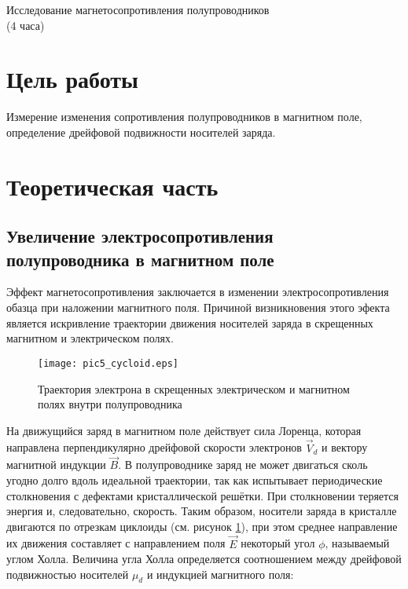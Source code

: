 \newpage

\setcounter{chapter}{5}

\begin{center}
Исследование магнетосопротивления полупроводников\\
(4 часа)
\end{center}

\section{Цель работы}
Измерение изменения сопротивления полупроводников в магнитном поле, определение дрейфовой подвижности носителей заряда.

\section{Теоретическая часть}

\subsection{Увеличение электросопротивления полупроводника в магнитном поле}

Эффект магнетосопротивления заключается в изменении электросопротивления обазца при наложении магнитного поля. Причиной визникновения этого эфекта является искривление траектории движения носителей заряда в скрещенных магнитном и электрическом полях.

\begin{figure}[h!]\centering
\texttt{[image: pic5\_cycloid.eps]}
\caption{Траектория электрона в скрещенных электрическом и магнитном полях внутри полупроводника}
\label{pic5_cycloid}
\end{figure}

На движущийся заряд в магнитном поле действует сила Лоренца, которая направлена перпендикулярно дрейфовой скорости электронов $\overrightarrow{V}_{d}$ и вектору магнитной индукции $\overrightarrow{B}$. В полупроводнике заряд не может двигаться сколь угодно долго вдоль идеальной траектории, так как испытывает периодические столкновения с дефектами кристаллической решётки. При столкновении теряется энергия и, следовательно, скорость. Таким образом, носители заряда в кристалле двигаются по отрезкам циклоиды (см. рисунок \ref{pic5_cycloid}), при этом среднее направление их движения составляет с направлением поля $\overrightarrow{E}$ некоторый угол $\phi$, называемый углом Холла. Величина угла Холла определяется соотношением между дрейфовой подвижностью носителей $\mu_{d} $ и индукцией магнитного поля:

